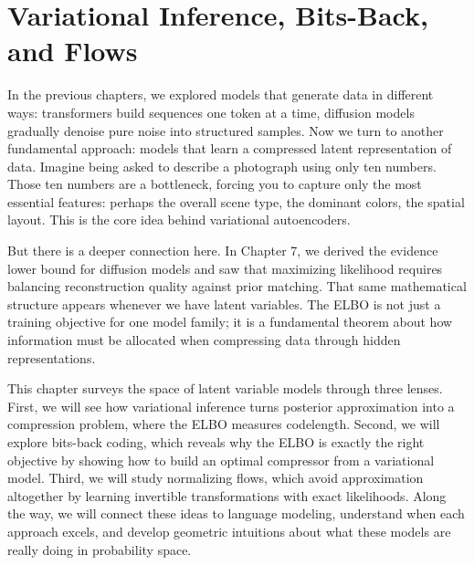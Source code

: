 
\chapter{Variational Inference, Bits-Back, and Flows}
\label{ch:vae_flows}

\vspace{1em}

In the previous chapters, we explored models that generate data in different ways: transformers build sequences one token at a time, diffusion models gradually denoise pure noise into structured samples. Now we turn to another fundamental approach: models that learn a compressed latent representation of data. Imagine being asked to describe a photograph using only ten numbers. Those ten numbers are a bottleneck, forcing you to capture only the most essential features: perhaps the overall scene type, the dominant colors, the spatial layout. This is the core idea behind variational autoencoders.

\vspace{0.3cm}

But there is a deeper connection here. In Chapter 7, we derived the evidence lower bound for diffusion models and saw that maximizing likelihood requires balancing reconstruction quality against prior matching. That same mathematical structure appears whenever we have latent variables. The ELBO is not just a training objective for one model family; it is a fundamental theorem about how information must be allocated when compressing data through hidden representations.

\vspace{0.3cm}

This chapter surveys the space of latent variable models through three lenses. First, we will see how variational inference turns posterior approximation into a compression problem, where the ELBO measures codelength. Second, we will explore bits-back coding, which reveals why the ELBO is exactly the right objective by showing how to build an optimal compressor from a variational model. Third, we will study normalizing flows, which avoid approximation altogether by learning invertible transformations with exact likelihoods. Along the way, we will connect these ideas to language modeling, understand when each approach excels, and develop geometric intuitions about what these models are really doing in probability space.

